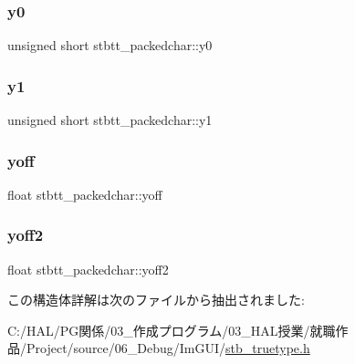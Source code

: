 \subsubsection{\texorpdfstring{y0}{y0}}
{\footnotesize\ttfamily unsigned short stbtt\+\_\+packedchar\+::y0}

\mbox{\label{structstbtt__packedchar_a9569073ba79fad355210b6ffc35905a7}} 
\subsubsection{\texorpdfstring{y1}{y1}}
{\footnotesize\ttfamily unsigned short stbtt\+\_\+packedchar\+::y1}

\mbox{\label{structstbtt__packedchar_a6f342ae10df5319f4999ffd256567142}} 
\subsubsection{\texorpdfstring{yoff}{yoff}}
{\footnotesize\ttfamily float stbtt\+\_\+packedchar\+::yoff}

\mbox{\label{structstbtt__packedchar_a2ec5bbd1010c9a9b7cbdeb7503dcaffa}} 
\subsubsection{\texorpdfstring{yoff2}{yoff2}}
{\footnotesize\ttfamily float stbtt\+\_\+packedchar\+::yoff2}



この構造体詳解は次のファイルから抽出されました\+:\begin{DoxyCompactItemize}
\item 
C\+:/\+H\+A\+L/\+P\+G関係/03\+\_\+作成プログラム/03\+\_\+\+H\+A\+L授業/就職作品/\+Project/source/06\+\_\+\+Debug/\+Im\+G\+U\+I/\mbox{\hyperlink{stb__truetype_8h}{stb\+\_\+truetype.\+h}}\end{DoxyCompactItemize}
